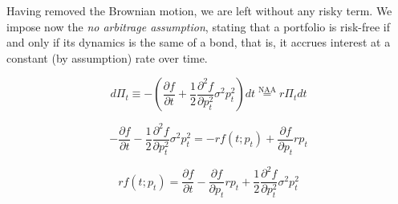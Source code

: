 \documentclass[oneside,titlepage,headinclude,12pt,a4paper,BCOR5mm,footinclude]{book}
\theoremstyle{defn}
\newcommand{\de}{\partial}
\begin{document}
  Having removed  the Brownian motion,  we are left  without any risky  term. We
  impose now the  \textit{no arbitrage assumption}, stating that  a portfolio is
  risk-free if  and only  if its dynamics  is the  same of a  bond, that  is, it
  accrues interest at a constant (by assumption) rate over time.

  \[
    d\Pi_t \equiv - \left( \frac{\partial f}{\partial t} + 
      \frac{1}{2}\frac{\partial^2 f}{\partial p_t^2} \sigma^2 p_t^2 \right) dt 
      \stackrel{\text{NAA}}{=} r\Pi_t dt
  \]

  \[
    -\frac{\de f}{\de t} -\frac{1}{2}\frac{\de^2f}{\de p_t^2} \sigma^2 p_t^2 =
    -rf(t;p_t) + \frac{\de f}{\de p_t} rp_t
  \]

  \[
    rf(t;p_t) = \frac{\de f}{\de t} - \frac{\de f}{\de p_t} rp_t + \frac{1}{2}\frac{\de^2 f}{\de p_t^2} \sigma^2 p_t^2
  \]
\end{document}
